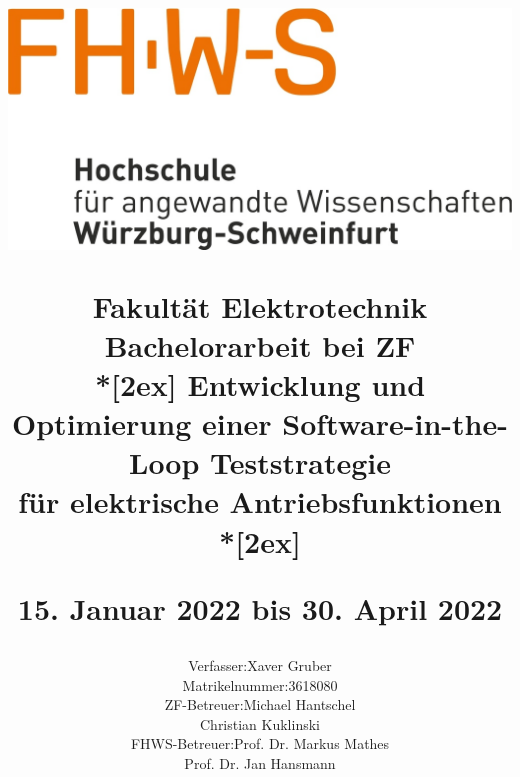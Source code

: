      \begin{titlepage}
%	 
\title{ \centerline{\hspace*{20mm}\includegraphics[scale=.2,]{FH_Wuerzburg_Schweinfurt_Logo.jpg}} 
 \vspace{15pt}
 {\Large Fakultät Elektrotechnik}
     \vspace{45pt}
    \\ Bachelorarbeit bei ZF\\*[2ex]
     Entwicklung und Optimierung einer Software-in-the-Loop Teststrategie \\ für elektrische Antriebsfunktionen\\*[2ex] 

	\textrm{15. Januar 2022 bis 30. April 2022}}
	\author{\begin{tabular}{ll}
	Verfasser: & Xaver Gruber \\ Matrikelnummer: & 3618080\\
	ZF-Betreuer: & Michael Hantschel \\ & Christian Kuklinski \\ FHWS-Betreuer: & Prof. Dr. Markus Mathes \\ & Prof. Dr. Jan Hansmann \\ %
\end{tabular}}

\date{}

	\maketitle
    \end{titlepage}